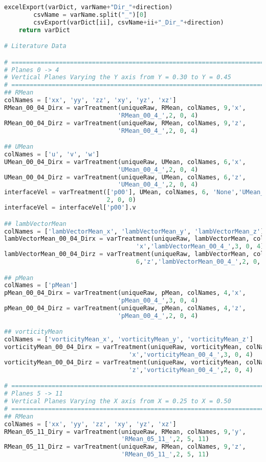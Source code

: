\documentclass[../main.tex]{subfiles}
\begin{document}
\begin{lstlisting}[language=python]
        excelExport(varDict, varName+"Dir_"+direction)
        csvName = varName.split("_")[0]
        csvExport(varDict[ii], csvName+ii+"_Dir_"+direction)
    return varDict

# Literature Data

# =============================================================================
# Planes 0 -> 4
# Vertical Planes Varying the Y axis from Y = 0.30 to Y = 0.45
# =============================================================================
## RMean
colNames = ['xx', 'yy', 'zz', 'xy', 'yz', 'xz']
RMean_00_04_Dirx = varTreatment(uniqueRaw, RMean, colNames, 9,'x',
                               'RMean_00_4_',2, 0, 4)
RMean_00_04_Dirz = varTreatment(uniqueRaw, RMean, colNames, 9,'z',
                               'RMean_00_4_',2, 0, 4)

## UMean
colNames = ['u', 'v', 'w']
UMean_00_04_Dirx = varTreatment(uniqueRaw, UMean, colNames, 6,'x',
                               'UMean_00_4_',2, 0, 4)
UMean_00_04_Dirz = varTreatment(uniqueRaw, UMean, colNames, 6,'z',
                               'UMean_00_4_',2, 0, 4)
interfaceVel = varTreatment(['p00'], UMean, colNames, 6, 'None','UMean_p00_',
                            2, 0, 0)
interfaceVel = interfaceVel['p00'].v

## lambVectorMean
colNames = ['lambVectorMean_x', 'lambVectorMean_y', 'lambVectorMean_z']
lambVectorMean_00_04_Dirx = varTreatment(uniqueRaw, lambVectorMean, colNames, 6,
                                    'x','lambVectorMean_00_4_',3, 0, 4)
lambVectorMean_00_04_Dirz = varTreatment(uniqueRaw, lambVectorMean, colNames,
                                    6,'z','lambVectorMean_00_4_',2, 0, 4)

## pMean
colNames = ['pMean']
pMean_00_04_Dirx = varTreatment(uniqueRaw, pMean, colNames, 4,'x',
                               'pMean_00_4_',3, 0, 4)
pMean_00_04_Dirz = varTreatment(uniqueRaw, pMean, colNames, 4,'z',
                               'pMean_00_4_',2, 0, 4)

## vorticityMean
colNames = ['vorticityMean_x', 'vorticityMean_y', 'vorticityMean_z']
vorticityMean_00_04_Dirx = varTreatment(uniqueRaw, vorticityMean, colNames, 6,
                                  'x','vorticityMean_00_4_',3, 0, 4)
vorticityMean_00_04_Dirz = varTreatment(uniqueRaw, vorticityMean, colNames, 6,
                                  'z','vorticityMean_00_4_',2, 0, 4)

# =============================================================================
# Planes 5 -> 11
# Vertical Planes Varying the X axis from X = 0.25 to X = 0.50
# =============================================================================
## RMean
colNames = ['xx', 'yy', 'zz', 'xy', 'yz', 'xz']
RMean_05_11_Diry = varTreatment(uniqueRaw, RMean, colNames, 9,'y',
                                'RMean_05_11_',2, 5, 11)
RMean_05_11_Dirz = varTreatment(uniqueRaw, RMean, colNames, 9,'z',
                                'RMean_05_11_',2, 5, 11)


\end{lstlisting}
\end{document}
